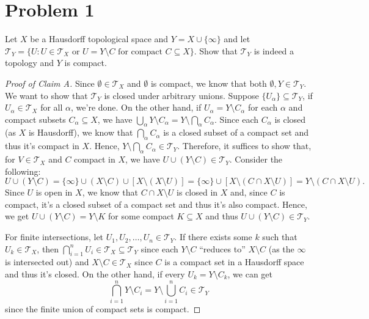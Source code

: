 \documentclass[11pt]{article} %
\begin{document}
\section*{Problem 1}
Let $X$ be a Hausdorff topological space and $Y = X\cup\{\infty\}$ and let $\mathcal{T}_Y= \{U:U\in \mathcal{T}_X\text{ or }U = Y\setminus C\text{ for compact }C\subseteq X\}$. Show that $\mathcal{T}_Y$ is indeed a topology and $Y$ is compact.

\begin{proof}[Proof of Claim A]
Since $\emptyset\in \mathcal{T}_X$ and $\emptyset$ is compact, we know that both $\emptyset, Y\in \mathcal{T}_Y$. We want to show that $\mathcal{T}_Y$ is closed under arbitrary unions. Suppose $\{U_\alpha\}\subseteq \mathcal{T}_Y$, if $U_\alpha\in \mathcal{T}_X$ for all $\alpha$, we're done. On the other hand, if $U_\alpha = Y\setminus C_\alpha$ for each $\alpha$ and compact subsets $C_\alpha\subseteq X$, we have $\bigcup_\alpha Y\setminus C_\alpha = Y\setminus \bigcap_\alpha C_\alpha$. Since each $C_\alpha$ is closed (as $X$ is Hausdorff), we know that $\bigcap_\alpha C_\alpha$ is a closed subset of a compact set and thus it's compact in $X$. Hence, $Y\setminus \bigcap_\alpha C_\alpha \in \mathcal{T}_Y$. Therefore, it suffices to show that, for $V\in \mathcal{T}_X$ and $C$ compact in $X$, we have $U\cup (Y\setminus C)\in \mathcal{T}_Y$. Consider the following:
\[U\cup (Y\setminus C) = \{\infty\}\cup (X\setminus C) \cup [X\setminus(X\setminus U)] = \{\infty\}\cup [X\setminus (C\cap X\setminus U)] = Y\setminus (C\cap X\setminus U).\]
Since $U$ is open in $X$, we know that $C\cap X\setminus U$ is closed in $X$ and, since $C$ is compact, it's a closed subset of a compact set and thus it's also compact. Hence, we get $U \cup (Y\setminus C) = Y\setminus K$ for some compact $K\subseteq X$ and thus $U \cup (Y\setminus C)\in \mathcal{T}_Y$.

For finite intersections, let $U_1,U_2,\ldots, U_n\in \mathcal{T}_Y$. If there exists some $k$ such that $U_k\in \mathcal{T}_X$, then $\bigcap_{i=1}^n U_i\in \mathcal{T}_X\subseteq \mathcal{T}_Y$ since each $Y\setminus C$ ``reduces to'' $X\setminus C$ (as the $\infty$ is intersected out) and $X\setminus C\in \mathcal{T}_X$ since $C$ is a compact set in a Hausdorff space and thus it's closed. On the other hand, if every $U_k = Y\setminus C_k$, we can get
\[\bigcap_{i=1}^n Y\setminus C_i = Y\setminus \bigcup_{i=1}^n C_i\in \mathcal{T}_Y\]
since the finite union of compact sets is compact.
\end{proof}
\end{document}
